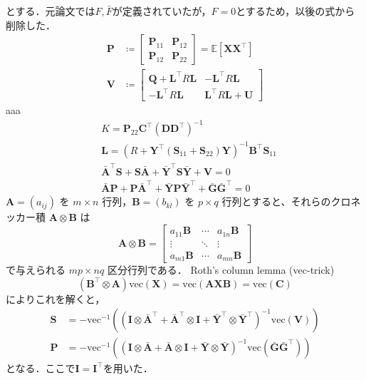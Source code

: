とする．元論文では$F, \bar{F}$が定義されていたが，$F=0$とするため，以後の式から削除した．
\begin{align}
\mathbf{P} &\coloneqq \begin{bmatrix}
\mathbf{P}_{11} & \mathbf{P}_{12} \\
\mathbf{P}_{12} & \mathbf{P}_{22}
\end{bmatrix} = \mathbb{E}\left[\mathbf{X} \mathbf{X}^\top\right] \\
\mathbf{V} &\coloneqq \begin{bmatrix}
\mathbf{Q}+\mathbf{L}^\top R \mathbf{L} & -\mathbf{L}^\top R \mathbf{L} \\
-\mathbf{L}^\top R \mathbf{L} & \mathbf{L}^\top R \mathbf{L}+\mathbf{U}
\end{bmatrix}
\end{align}
aaa
\begin{align}
&K=\mathbf{P}_{22} \mathbf{C}^\top\left(\mathbf{D} \mathbf{D}^\top\right)^{-1} \\
&\mathbf{L}=\left(R+\mathbf{Y}^\top\left(\mathbf{S}_{11}+\mathbf{S}_{22}\right) \mathbf{Y}\right)^{-1} \mathbf{B}^\top \mathbf{S}_{11} \\
&\bar{\mathbf{A}}^\top \mathbf{S}+\mathbf{S} \bar{\mathbf{A}}+\bar{\mathbf{Y}}^\top \mathbf{S} \bar{\mathbf{Y}}+\mathbf{V}=0 \\
&\bar{\mathbf{A}} \mathbf{P}+\mathbf{P} \bar{\mathbf{A}}^\top+\bar{\mathbf{Y}} \mathbf{P} \bar{\mathbf{Y}}^\top+\bar{\mathbf{G}} \bar{\mathbf{G}}^\top=0
\end{align}
$\mathbf{A} = (a_{ij})$ を $m \times n$ 行列，$\mathbf{B} = (b_{kl})$ を $p \times q$ 行列とすると、それらのクロネッカー積 $\mathbf{A} \otimes \mathbf{B}$ は
\begin{equation}
\mathbf{A}\otimes \mathbf{B}={\begin{bmatrix}a_{11}\mathbf{B}&\cdots &a_{1n}\mathbf{B}\\\vdots &\ddots &\vdots \\a_{m1}\mathbf{B}&\cdots &a_{mn}\mathbf{B}\end{bmatrix}}
\end{equation}
で与えられる $mp \times nq$ 区分行列である．
Roth's column lemma (vec-trick) 
\begin{equation}
(\mathbf{B}^\top \otimes \mathbf{A})\text{vec}(\mathbf{X}) = \text{vec}(\mathbf{A}\mathbf{X}\mathbf{B})=\text{vec}(\mathbf{C})
\end{equation}
によりこれを解くと，
\begin{align}
\mathbf{S} &= -\text{vec}^{-1}\left(\left(\mathbf{I} \otimes \bar{\mathbf{A}}^\top + \bar{\mathbf{A}}^\top \otimes \mathbf{I} + \bar{\mathbf{Y}}^\top \otimes \bar{\mathbf{Y}}^\top\right)^{-1}\text{vec}(\mathbf{V})\right)\\
\mathbf{P} &= -\text{vec}^{-1}\left(\left(\mathbf{I} \otimes \bar{\mathbf{A}} + \bar{\mathbf{A}} \otimes \mathbf{I} + \bar{\mathbf{Y}} \otimes \bar{\mathbf{Y}}\right)^{-1}\text{vec}(\bar{\mathbf{G}}\bar{\mathbf{G}}^\top)\right)
\end{align}
となる．ここで$\mathbf{I}=\mathbf{I}^\top$を用いた．
